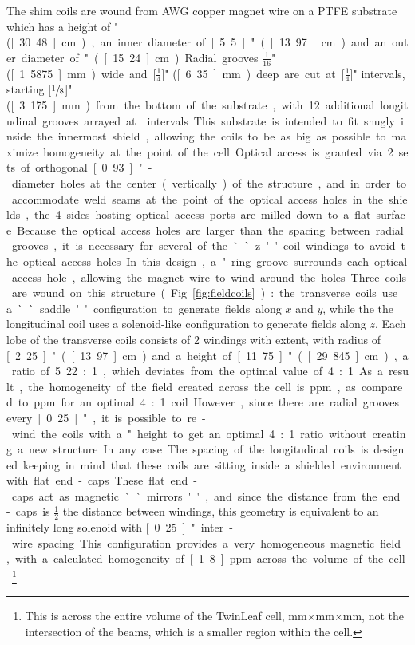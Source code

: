 \documentclass[PaulGanssle-Thesis.tex]{subfiles}
\begin{document}
The shim coils are wound from \unit[30]{AWG} copper magnet wire on a PTFE substrate which has a height of \unit[12]{"} (\unit[30.48]{cm}), an inner diameter of \unit[5.5]{"} (\unit[13.97]{cm}) and an outer diameter of \unit[6]{"} (\unit[15.24]{cm}). Radial grooves $\tfrac{1}{16}$" (\unit[1.5875]{mm}) wide and \unit[$\tfrac{1}{4}$]{"} (\unit[6.35]{mm}) deep are cut at \unit[$\tfrac{1}{4}$]{"} intervals, starting \unit[$\sfrac{1}{8}$]{"} (\unit[3.175]{mm}) from the bottom of the substrate, with 12 additional longitudinal grooves arrayed at \unit[30]{\degsym} intervals. This substrate is intended to fit snugly inside the innermost shield, allowing the coils to be as big as possible to maximize homogeneity at the point of the cell. Optical access is granted via 2 sets of orthogonal \unit[0.93]{"}-diameter holes at the center (vertically) of the structure, and in order to accommodate weld seams at the point of the optical access holes in the shields, the 4 sides hosting optical access ports are milled down to a flat surface. Because the optical access holes are larger than the spacing between radial grooves, it is necessary for several of the ``z'' coil windings to avoid the optical access holes. In this design, a \unit[1]{"} ring groove surrounds each optical access hole, allowing the magnet wire to wind around the holes.

Three coils are wound on this structure (Fig. \ref{fig:fieldcoils}): the transverse coils use a ``saddle'' configuration to generate fields along $x$ and $y$, while the the longitudinal coil uses a solenoid-like configuration to generate fields along $z$. Each lobe of the transverse coils consists of 2 windings with \unit[120]{\degsym} extent, with radius of \unit[2.25]{"} (\unit[13.97]{cm}) and a height of \unit[11.75]{"} (\unit[29.845]{cm}), a ratio of 5.22:1, which deviates from the optimal value of 4:1. As a result, the homogeneity of the field created across the cell is \unit[109]{ppm}, as compared to \unit[66]{ppm} for an optimal 4:1 coil. However, since there are radial grooves every \unit[0.25]{"}, it is possible to re-wind the coils with a \unit[9]{"} height to get an optimal 4:1 ratio without creating a new structure. In any case 

The spacing of the longitudinal coils is designed keeping in mind that these coils are sitting inside a shielded environment with flat end-caps. These flat end-caps act as magnetic ``mirrors'', and since the distance from the end-caps is $\frac{1}{2}$ the distance between windings, this geometry is equivalent to an infinitely long solenoid with \unit[0.25]{"} inter-wire spacing. This configuration provides a very homogeneous magnetic field, with a calculated homogeneity of \unit[1.8]{ppm} across the volume of the cell.\footnote{This is across the entire volume of the TwinLeaf cell, \unit[5]{mm}$\times$\unit[5]{mm}$\times$\unit[8]{mm}, not the intersection of the beams, which is a smaller region within the cell.}
\end{document}
